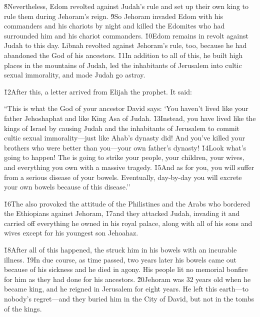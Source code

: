 \v{8}Nevertheless, Edom revolted against Judah's rule and set up their own king to rule them during Jehoram's reign. \v{9}So Jehoram invaded Edom with his commanders and his chariots by night and killed the Edomites who had surrounded him and his chariot commanders. \v{10}Edom remains in revolt against Judah to this day. Libnah revolted against Jehoram's rule, too, because he had abandoned the  God of his ancestors. \v{11}In addition to all of this, he built high places in the mountains of Judah, led the inhabitants of Jerusalem into cultic sexual immorality, and made Judah go astray.

\v{12}After this, a letter arrived from Elijah the prophet. It said:

\begin{poetry}
\poeml ``This is what the  God of your ancestor David says: `You haven't lived like your father Jehoshaphat and like King Asa of Judah. \v{13}Instead, you have lived like the kings of Israel by causing Judah and the inhabitants of Jerusalem to commit cultic sexual immorality---just like Ahab's dynasty did! And you've killed your brothers who were better than you---your own father's dynasty! \v{14}Look what's going to happen! The  is going to strike your people, your children, your wives, and everything you own with a massive tragedy. \v{15}And as for you, you will suffer from a serious disease of your bowels. Eventually, day-by-day you will excrete your own bowels because of this disease.''
\end{poetry}

\v{16}The  also provoked the attitude of the Philistines and the Arabs who bordered the Ethiopians against Jehoram, \v{17}and they attacked Judah, invading it and carried off everything he owned in his royal palace, along with all of his sons and wives except for his youngest son Jehoahaz.

\v{18}After all of this happened, the  struck him in his bowels with an incurable illness. \v{19}In due course, as time passed, two years later his bowels came out because of his sickness and he died in agony. His people lit no memorial bonfire for him as they had done for his ancestors. \v{20}Jehoram was 32 years old when he became king, and he reigned in Jerusalem for eight years. He left this earth---to nobody's regret---and they buried him in the City of David, but not in the tombs of the kings.

